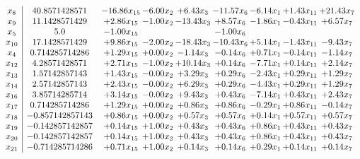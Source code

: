 \documentclass[8pt]{article}
\begin{document}
\[\begin{array}{c| c c@{\hskip 2pt} c@{\hskip 2pt} c@{\hskip 2pt} c@{\hskip 2pt} c@{\hskip 2pt} c@{\hskip 2pt} c@{\hskip 2pt} }
 x_{8}   &  40.8571428571 & -16.86 x_{15} & -6.00 x_{2} & +  6.43 x_{3} & -11.57 x_{6} & -6.14 x_{1} & +  1.43 x_{11} & + 21.43 x_{7}\\
 x_{9}   &  11.1428571429 & +  2.86 x_{15} & -1.00 x_{2} & -13.43 x_{3} & +  8.57 x_{6} & -1.86 x_{1} & -0.43 x_{11} & +  6.57 x_{7}\\
 x_{5}   &  5.0 & -1.00 x_{15} &    &   & -1.00 x_{6} &    &    &   \\
 x_{10}   &  17.1428571429 & +  9.86 x_{15} & -2.00 x_{2} & -18.43 x_{3} & -10.43 x_{6} & +  5.14 x_{1} & -1.43 x_{11} & -9.43 x_{7}\\
 x_{4}   &  0.714285714286 & +  1.29 x_{15} & +  0.00 x_{2} & -1.14 x_{3} & -0.14 x_{6} & +  0.71 x_{1} & -0.14 x_{11} & -1.14 x_{7}\\
 x_{12}   &  4.28571428571 & +  2.71 x_{15} & -1.00 x_{2} & + 10.14 x_{3} & +  0.14 x_{6} & -7.71 x_{1} & +  0.14 x_{11} & +  2.14 x_{7}\\
 x_{13}   &  1.57142857143 & +  1.43 x_{15} & -0.00 x_{2} & +  3.29 x_{3} & +  0.29 x_{6} & -2.43 x_{1} & +  0.29 x_{11} & +  1.29 x_{7}\\
 x_{14}   &  2.57142857143 & +  2.43 x_{15} & -0.00 x_{2} & +  6.29 x_{3} & +  0.29 x_{6} & -4.43 x_{1} & +  0.29 x_{11} & +  1.29 x_{7}\\
 x_{16}   &  3.85714285714 & +  3.14 x_{15} & -0.00 x_{2} & +  9.43 x_{3} & +  0.43 x_{6} & -7.14 x_{1} & +  0.43 x_{11} & +  2.43 x_{7}\\
 x_{17}   &  0.714285714286 & +  1.29 x_{15} & +  0.00 x_{2} & +  0.86 x_{3} & +  0.86 x_{6} & -0.29 x_{1} & +  0.86 x_{11} & -0.14 x_{7}\\
 x_{18}   &  -0.857142857143 & +  0.86 x_{15} & +  0.00 x_{2} & +  0.57 x_{3} & +  0.57 x_{6} & +  0.14 x_{1} & +  0.57 x_{11} & +  0.57 x_{7}\\
 x_{19}   &  -0.142857142857 & +  0.14 x_{15} & +  1.00 x_{2} & +  0.43 x_{3} & +  0.43 x_{6} & +  0.86 x_{1} & +  0.43 x_{11} & +  0.43 x_{7}\\
 x_{20}   &  -0.142857142857 & +  0.14 x_{15} & +  1.00 x_{2} & +  0.43 x_{3} & +  0.43 x_{6} & +  0.86 x_{1} & +  0.43 x_{11} & +  0.43 x_{7}\\
 x_{21}   &  -0.714285714286 & +  0.71 x_{15} & +  1.00 x_{2} & +  0.14 x_{3} & +  0.14 x_{6} & +  0.29 x_{1} & +  0.14 x_{11} & +  0.14 x_{7}\\

\end{array}\]
\end{document}
